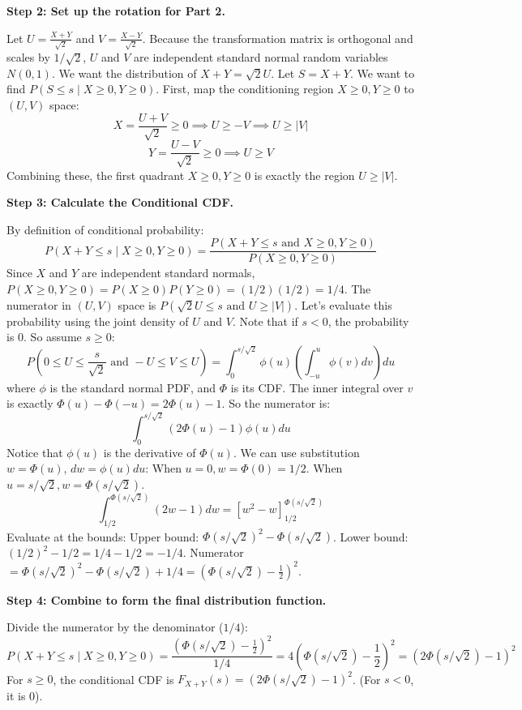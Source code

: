 \begin{solution}
\textbf{Step 2: Set up the rotation for Part 2.}

Let $U = \frac{X+Y}{\sqrt{2}}$ and $V = \frac{X-Y}{\sqrt{2}}$.
Because the transformation matrix is orthogonal and scales by $1/\sqrt{2}$, $U$ and $V$ are independent standard normal random variables $N(0,1)$.
We want the distribution of $X+Y = \sqrt{2} U$. Let $S = X+Y$. We want to find $P(S \leq s \mid X \geq 0, Y \geq 0)$.
First, map the conditioning region $X \geq 0, Y \geq 0$ to $(U, V)$ space:
\[ X = \frac{U+V}{\sqrt{2}} \geq 0 \implies U \geq -V \implies U \geq |V| \]
\[ Y = \frac{U-V}{\sqrt{2}} \geq 0 \implies U \geq V \]
Combining these, the first quadrant $X \geq 0, Y \geq 0$ is exactly the region $U \geq |V|$.

\textbf{Step 3: Calculate the Conditional CDF.}

By definition of conditional probability:
\[ P(X+Y \leq s \mid X \geq 0, Y \geq 0) = \frac{P(X+Y \leq s \text{ and } X \geq 0, Y \geq 0)}{P(X \geq 0, Y \geq 0)} \]
Since $X$ and $Y$ are independent standard normals, $P(X \geq 0, Y \geq 0) = P(X \geq 0)P(Y \geq 0) = (1/2)(1/2) = 1/4$.
The numerator in $(U, V)$ space is $P(\sqrt{2}U \leq s \text{ and } U \geq |V|)$.
Let's evaluate this probability using the joint density of $U$ and $V$. Note that if $s < 0$, the probability is 0. So assume $s \geq 0$:
\[ P\left(0 \leq U \leq \frac{s}{\sqrt{2}} \text{ and } -U \leq V \leq U \right) = \int_0^{s/\sqrt{2}} \phi(u) \left( \int_{-u}^u \phi(v) dv \right) du \]
where $\phi$ is the standard normal PDF, and $\Phi$ is its CDF.
The inner integral over $v$ is exactly $\Phi(u) - \Phi(-u) = 2\Phi(u) - 1$.
So the numerator is:
\[ \int_0^{s/\sqrt{2}} (2\Phi(u) - 1) \phi(u) du \]
Notice that $\phi(u)$ is the derivative of $\Phi(u)$. We can use substitution $w = \Phi(u)$, $dw = \phi(u)du$:
When $u=0, w=\Phi(0)=1/2$. When $u=s/\sqrt{2}, w=\Phi(s/\sqrt{2})$.
\[ \int_{1/2}^{\Phi(s/\sqrt{2})} (2w - 1) dw = \left[ w^2 - w \right]_{1/2}^{\Phi(s/\sqrt{2})} \]
Evaluate at the bounds:
Upper bound: $\Phi(s/\sqrt{2})^2 - \Phi(s/\sqrt{2})$.
Lower bound: $(1/2)^2 - 1/2 = 1/4 - 1/2 = -1/4$.
Numerator $= \Phi(s/\sqrt{2})^2 - \Phi(s/\sqrt{2}) + 1/4 = \left( \Phi(s/\sqrt{2}) - \frac{1}{2} \right)^2$.

\textbf{Step 4: Combine to form the final distribution function.}

Divide the numerator by the denominator ($1/4$):
\[ P(X+Y \leq s \mid X \geq 0, Y \geq 0) = \frac{\left( \Phi(s/\sqrt{2}) - \frac{1}{2} \right)^2}{1/4} = 4 \left( \Phi(s/\sqrt{2}) - \frac{1}{2} \right)^2 = \left( 2\Phi(s/\sqrt{2}) - 1 \right)^2 \]
For $s \geq 0$, the conditional CDF is $F_{X+Y}(s) = \left( 2\Phi(s/\sqrt{2}) - 1 \right)^2$. (For $s < 0$, it is 0).
\end{solution}

